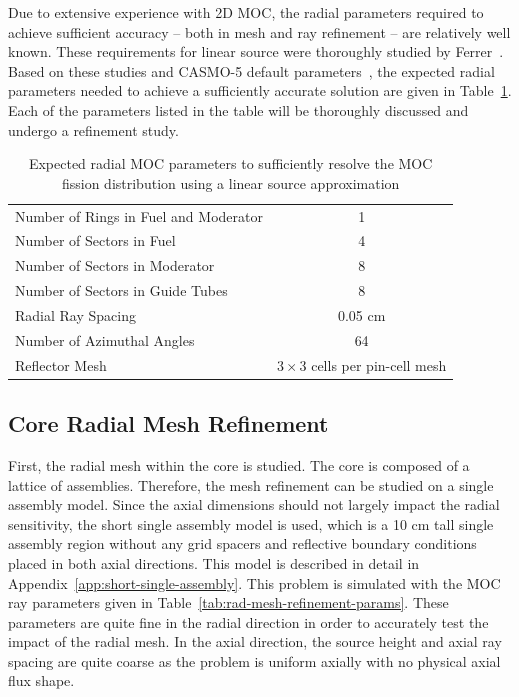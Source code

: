 Due to extensive experience with 2D \ac{MOC}, the radial parameters required to achieve sufficient accuracy -- both in mesh and ray refinement -- are relatively well known. These requirements for linear source were thoroughly studied by Ferrer~\cite{ferrer2012linear}. Based on these studies and CASMO-5 default parameters~\cite{rhodes2006casmo}, the expected radial parameters needed to achieve a sufficiently accurate solution are given in Table~\ref{tab:expected-radial-params}. Each of the parameters listed in the table will be thoroughly discussed and undergo a refinement study.

\begin{table}[ht]
	\centering
	\caption{Expected radial MOC parameters to sufficiently resolve the \ac{MOC} fission distribution using a linear source approximation}
	\medskip
	\begin{tabular}{lc}
		\hline
		Number of Rings in Fuel and Moderator & 1 \\
		Number of Sectors in Fuel & 4 \\
		Number of Sectors in Moderator & 8 \\
		Number of Sectors in Guide Tubes & 8 \\	
		Radial Ray Spacing & 0.05 cm \\
		Number of Azimuthal Angles & 64 \\
		Reflector Mesh & $3 \times 3$ cells per pin-cell mesh \\
		\hline
	\end{tabular}
	\label{tab:expected-radial-params}
\end{table}

\subsection{Core Radial Mesh Refinement}

First, the radial mesh within the core is studied. The core is composed of a lattice of assemblies. Therefore, the mesh refinement can be studied on a single assembly model. Since the axial dimensions should not largely impact the radial sensitivity, the short single assembly model is used, which is a 10 cm tall single assembly region without any grid spacers and reflective boundary conditions placed in both axial directions. This model is described in detail in Appendix~\ref{app:short-single-assembly}. This problem is simulated with the \ac{MOC} ray parameters given in Table~\ref{tab:rad-mesh-refinement-params}. These parameters are quite fine in the radial direction in order to accurately test the impact of the radial mesh. In the axial direction, the source height and axial ray spacing are quite coarse as the problem is uniform axially with no physical axial flux shape.


